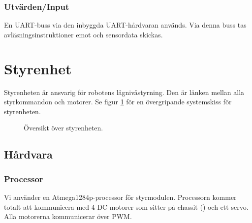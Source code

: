 \documentclass[a4paper,11pt]{article}
\begin{document}
\subsubsection{Utvärden/Input}
En UART-buss via den inbyggda UART-hårdvaran används. Via denna buss tas avläsningsinstruktioner emot och sensordata skickas.

\newpage
\section{Styrenhet} \label{sec:system2}
Styrenheten är ansvarig för robotens lågnivåstyrning. Den är länken mellan alla styrkommandon och motorer. Se figur \ref{fig:unitMotorcontroller} för en övergripande systemskiss för styrenheten.

\begin{figure}[h!]
    \caption{Översikt över styrenheten.}
    \label{fig:unitMotorcontroller}
\end{figure}

\subsection{Hårdvara}

\subsubsection{Processor}
Vi använder en Atmega1284p-processor för styrmodulen. Processorn kommer totalt att kommunicera med 4 DC-motorer som sitter på chassit (\cite{terminator}) och ett servo. Alla motorerna kommunicerar över PWM.
\end{document}
